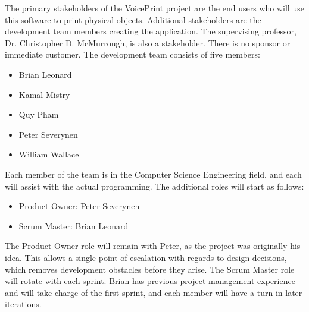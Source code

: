 The primary stakeholders of the VoicePrint project are the end users who will use this software to print physical objects. Additional stakeholders are the development team members creating the application. The supervising professor, Dr. Christopher D. McMurrough, is also a stakeholder. There is no sponsor or immediate customer. The development team consists of five members:
\begin{itemize}
    \item Brian Leonard
    \item Kamal Mistry
    \item Quy Pham
    \item Peter Severynen
    \item William Wallace
\end{itemize}
Each member of the team is in the Computer Science Engineering field, and each will assist with the actual programming. The additional roles will start as follows:
\begin{itemize}
  \item Product Owner: Peter Severynen
  \item Scrum Master: Brian Leonard
\end{itemize}
The Product Owner role will remain with Peter, as the project was originally his idea. This allows a single point of escalation with regards to design decisions, which removes development obstacles before they arise.
The Scrum Master role will rotate with each sprint. Brian has previous project management experience and will take charge of the first sprint, and each member will have a turn in later iterations.